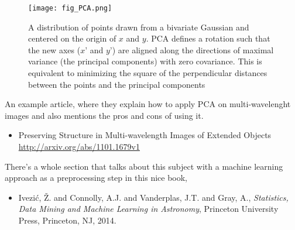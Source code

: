 \documentclass[11pt,fleqn]{book} %
\begin{document}
											    \begin{figure}[h]
											        \centering
												    \texttt{[image: fig\_PCA.png]}
												        \caption{A distribution of points drawn from a bivariate Gaussian and centered on the origin of $x$ and $y$. PCA defines a rotation such that the new axes ($x’$ and $y’$) are aligned along the directions of maximal variance (the principal components) with zero covariance. This is equivalent to minimizing the square of the perpendicular distances between the points and the principal components}
													    \label{fig:pca}
													    \end{figure}

													    \begin{remark}
													    	An example article, where they explain how to apply PCA on multi-wavelenght images and also mentions the pros and cons of using it.
														    \begin{itemize}
														        	\item Preserving Structure in Multi-wavelength Images of Extended Objects\\ \url{http://arxiv.org/abs/1101.1679v1}
																    \end{itemize}
																        There's a whole section that talks about this subject with a machine learning approach as a preprocessing step in this nice book,
																	    \begin{itemize}
																	        	\item Ivezi{\'c}, \v Z. and Connolly, A.J.
																			         and Vanderplas, J.T. and Gray, A., \textit{Statistics, Data Mining and Machine Learning in Astronomy}, Princeton University Press, Princeton, NJ, 2014.
																				     \end{itemize}
																				     \end{remark}
\end{document}
